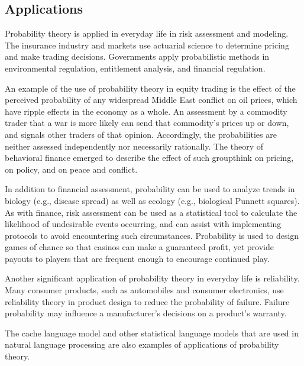 \subsection{Applications}
\label{sss:appl-b5fb}




Probability theory is applied in everyday life in risk assessment and modeling. The
insurance industry and markets use actuarial science to determine pricing and make trading
decisions. Governments apply probabilistic methods in environmental regulation,
entitlement analysis, and financial regulation.



An example of the use of probability theory in equity trading is the effect of the
perceived probability of any widespread Middle East conflict on oil prices, which have
ripple effects in the economy as a whole. An assessment by a commodity trader that a war
is more likely can send that commodity's prices up or down, and signals other traders of
that opinion. Accordingly, the probabilities are neither assessed independently nor
necessarily rationally. The theory of behavioral finance emerged to describe the effect of
such groupthink on pricing, on policy, and on peace and conflict.



In addition to financial assessment, probability can be used to analyze trends in biology
(e.g., disease spread) as well as ecology (e.g., biological Punnett squares). As with
finance, risk assessment can be used as a statistical tool to calculate the likelihood of
undesirable events occurring, and can assist with implementing protocols to avoid
encountering such circumstances. Probability is used to design games of chance so that
casinos can make a guaranteed profit, yet provide payouts to players that are frequent
enough to encourage continued play.



Another significant application of probability theory in everyday life is reliability.
Many consumer products, such as automobiles and consumer electronics, use reliability
theory in product design to reduce the probability of failure. Failure probability may
influence a manufacturer's decisions on a product's warranty.



The cache language model and other statistical language models that are used in natural
language processing are also examples of applications of probability theory.




